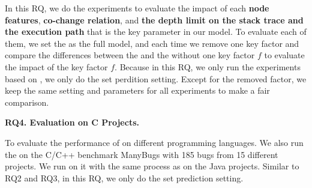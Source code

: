 In this RQ, we do the experiments to evaluate the impact of each {\bf node features}, {\bf co-change relation}, and {\bf the depth limit on the stack trace and the execution path} that is the key parameter in our model. To evaluate each of them, we set the \tool as the full model, and each time we remove one key factor and compare the differences between the \tool and the \tool without one key factor $f$ to evaluate the impact of the key factor $f$. Because in this RQ, we only run the experiments based on \tool, we only do the set perdition setting. Except for the removed factor, we keep the same setting and parameters for all experiments to make a fair comparison.

{\bf RQ4. Evaluation on C Projects.}

To evaluate the performance of \tool on different programming languages. We also run the \tool on the C/C++ benchmark ManyBugs \cite{manybugs} with 185 bugs from 15 different projects. We run \tool on it with the same process as on the Java projects. Similar to RQ2 and RQ3, in this RQ, we only do the set prediction setting.
